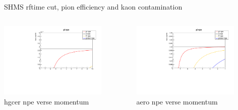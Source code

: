 \documentclass[aspectratio=169,xcolor=dvipsnames]{beamer}
\begin{document}
\begin{frame}{SHMS rftime cut, pion efficiency and kaon contamination}
  \begin{columns}
    \begin{column}[T]{0.5\textwidth}
      \includegraphics[width = 0.8\textwidth]{graphs/cerenkov/hgc_npe_p.pdf}
      \\
      hgcer npe verse momentum
    \end{column}
    \begin{column}[T]{0.5\textwidth}
      \includegraphics[width = 0.8\textwidth]{graphs/cerenkov/aero_npe_p.pdf}
      \\
      aero npe verse momentum
    \end{column}
  \end{columns}
\end{frame}
\end{document}
